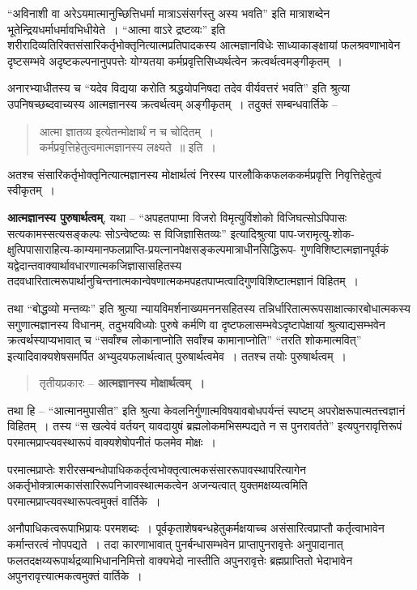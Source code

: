 {“अविनाशी वा अरेऽयमात्मानुच्छित्तिधर्मा मात्राऽसंसर्गस्तु अस्य भवति” इति मात्राशब्देन भूतेन्द्रियधर्माधर्मावभिधीयेते~। “आत्मा वाऽरे द्रष्टव्यः” इति शरीरादिव्यतिरिक्तसंसारिकर्तृभोक्तृनित्यात्मप्रतिपादकस्य आत्मज्ञानविधेः साध्याकाङ्क्षायां फलश्रवणाभावेन दृष्टसम्भवे अदृष्टकल्पनानुपपत्तेः योग्यतया कर्मप्रवृत्तिसिध्यर्थत्वेन क्रत्वर्थत्वमङ्गीकृतम्~। 

अनारभ्याधीतस्य च “यदेव विद्यया करोति श्रद्धयोपनिषदा तदेव वीर्यवत्तरं भवति” इति श्रुत्या उपनिषच्छब्दवाच्यस्य आत्मज्ञानस्य क्रत्वर्थत्वम् अङ्गीकृतम्~। तदुक्तं सम्बन्धवार्तिके –
\begin{verse}
आत्मा ज्ञातव्य इत्येतन्मोक्षार्थं न च चोदितम्~। \\
कर्मप्रवृत्तिहेतुत्वमात्मज्ञानस्य लक्ष्यते~॥ इति~। 
\end{verse}
अतश्च संसारिकर्तृभोक्तृनित्यात्मज्ञानस्य मोक्षार्थत्वं निरस्य पारलौकिकफलककर्मप्रवृत्ति निवृत्तिहेतुत्वं स्वीकृतम्~। 

\textbf{आत्मज्ञानस्य पुरुषार्थत्वम्}, यथा – “अपहतपाप्मा विजरो विमृत्युर्विशोको विजिघत्सोऽपिपासः सत्यकामस्सत्यसङ्कल्पः सोऽन्वेष्टव्यः स विजिज्ञासितव्यः” इत्यादिश्रुत्या पाप-जरामृत्यु-शोक-क्षुत्पिपासाराहित्य-काम्यमानफलप्राप्ति-प्रयत्नानपेक्षसङ्कल्पमात्राधीनसिद्धि\-रूप- गुणविशिष्टात्मज्ञानपूर्वकं यद्वेदान्तवाक्यार्थावधारणात्मकजिज्ञासासहितस्य तदवधारितात्मरूपार्थानुचिन्तनात्मकान्वेषणात्मकमपहतपाप्मत्वादिगुणविशिष्टात्मज्ञानं विहितम्~। 

तथा “बोद्धव्यो मन्तव्यः” इति श्रुत्या न्यायविमर्शनाख्यमननसहितस्य तन्निर्धारितात्मरूपसाक्षात्कारबोधात्मकस्य सगुणात्मज्ञानस्य विधानम्, तदुभयविध्योः पुरुषे कर्मणि वा दृष्टफलासम्भवेऽदृष्टापेक्षायां श्रुत्याद्यसम्भवेन क्रत्वर्थस्याप्यभावात् च “सर्वांश्च लोकानाप्नोति सर्वांश्च कामानाप्नोति” “तरति शोकमात्मवित्” इत्यादिवाक्यशेषसमर्पित अभ्युदयफलार्थत्वात् पुरुषार्थत्वमेव~। ततश्च तयोः पुरुषार्थत्वम्~। 
\begin{verse}
तृतीयप्रकारः – \textbf{आत्मज्ञानस्य मोक्षार्थत्वम्~। }
\end{verse}
तथा हि – “आत्मानमुपासीत” इति श्रुत्या केवलनिर्गुणात्मविषयावबोधपर्यन्तं स्पष्टम् अपरोक्षरूपात्मतत्त्वज्ञानं विहितम्~। तस्य “स खल्वेवं वर्तयन् यावदायुषं ब्रह्मलोकमभिसम्पद्यते न स पुनरावर्तते” इत्यपुनरावृत्तिरूपं परमात्मप्राप्त्यवस्थारूपं वाक्यशेषोपनीतं फलमेव मोक्षः~। 

परमात्मप्राप्तेः शरीरसम्बन्धोपाधिककर्तृत्वभोक्तृत्वात्मकसंसाररूपावस्थापरित्यागेन अकर्तृभोक्त्रात्मकासंसारिरूपनिजावस्थात्मकत्वेन अजन्यत्वात् युक्तमक्षय्यत्वमिति परमात्मप्राप्त्यवस्थारूपत्वमुक्तं वार्तिके~। 

अनौपाधिकत्वरूपाभिप्रायः परमशब्दः~। पूर्वकृताशेषबन्धहेतुकर्मक्षयाच्च असंसारित्वप्राप्तौ कर्तृत्वाभावेन कर्मान्तरत्वं नोपपद्यते~। तदा कारणाभावात् पुनर्बन्धासम्भवेन प्राप्तापुनरावृत्तेः अनुपादानात् फलतदक्षय्यरूपार्थद्रव्याभिधाननिमित्तो वाक्यभेदो नास्तीति अपुनरावृत्तेः ब्रह्मप्राप्तितो भेदाभावेन अपुनरावृत्त्यात्मकत्वमुक्तं वार्तिके~। 

}
